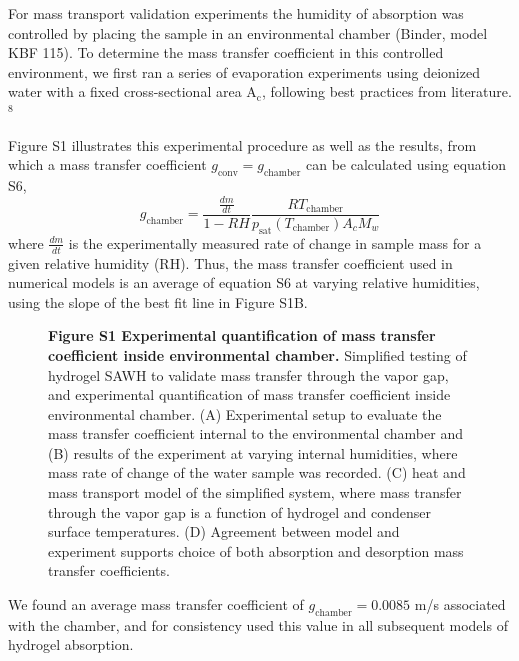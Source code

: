 \documentclass[11pt]{article}
\newcommand{\figbox}[1]{%
  \fbox{\parbox[c][#1][c]{0.92\textwidth}{\centering\itshape [figure image]}}}
\begin{document}
For mass transport validation experiments the humidity of absorption was controlled by placing the sample in an environmental chamber (Binder, model KBF 115). To determine the mass transfer coefficient in this controlled environment, we first ran a series of evaporation experiments using deionized water with a fixed cross-sectional area A$_{\mathrm{c}}$, following best practices from literature.$^{8}$

Figure S1 illustrates this experimental procedure as well as the results, from which a mass transfer coefficient $g_{\mathrm{conv}} = g_{\mathrm{chamber}}$ can be calculated using equation S6,
\begin{equation}
g_{\mathrm{chamber}} = \frac{\frac{dm}{dt}}{1 - RH}\frac{RT_{\mathrm{chamber}}}{p_{\mathrm{sat}}\left(T_{\mathrm{chamber}}\right)A_{c}M_{w}}
\end{equation}
where $\frac{dm}{dt}$ is the experimentally measured rate of change in sample mass for a given relative humidity (RH). Thus, the mass transfer coefficient used in numerical models is an average of equation S6 at varying relative humidities, using the slope of the best fit line in Figure S1B.

\begin{figure}[!ht]
\centering
\figbox{8cm}
\caption*{\textbf{Figure S1 Experimental quantification of mass transfer coefficient inside environmental chamber.} Simplified testing of hydrogel SAWH to validate mass transfer through the vapor gap, and experimental quantification of mass transfer coefficient inside environmental chamber. (A) Experimental setup to evaluate the mass transfer coefficient internal to the environmental chamber and (B) results of the experiment at varying internal humidities, where mass rate of change of the water sample was recorded. (C) heat and mass transport model of the simplified system, where mass transfer through the vapor gap is a function of hydrogel and condenser surface temperatures. (D) Agreement between model and experiment supports choice of both absorption and desorption mass transfer coefficients.}
\end{figure}

We found an average mass transfer coefficient of $g_{\mathrm{chamber}} = 0.0085$ m/s associated with the chamber, and for consistency used this value in all subsequent models of hydrogel absorption.
\end{document}
